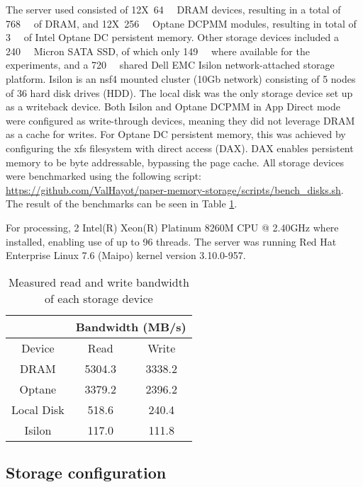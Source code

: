 \documentclass[conference]{IEEEtran}
\begin{document}
The server used consisted of 12X~\SI{64}{\gibi\byte} DRAM devices,
resulting in a total of \SI{768}{\gibi\byte} of DRAM, and 12X~\SI{256}{\giga\byte} Optane DCPMM
modules, resulting in total of \SI{3}{\tebi\byte} of Intel Optane DC persistent memory.
Other storage devices included a \SI{240}{\gibi\byte} Micron SATA SSD, of which
only \SI{149}{\gibi\byte} where available for the experiments, and a
\SI{720}{\tebi\byte} shared Dell EMC Isilon network-attached storage platform. Isilon is an nsf4 mounted
cluster (10Gb network) consisting of 5 nodes of 36 hard disk drives (HDD). The local disk
was the only storage device set up as a writeback device. Both Isilon and Optane DCPMM in
App Direct mode were configured as write-through devices, meaning they did not leverage
DRAM as a cache for writes. For Optane DC persistent memory, this was achieved by configuring the xfs filesystem with
direct access (DAX). DAX enables persistent memory to be byte addressable, bypassing the page cache. All storage devices were benchmarked using the following script: \url{https://github.com/ValHayot/paper-memory-storage/scripts/bench_disks.sh}.
The result of the benchmarks can be seen in Table \ref{table:bandwidths}.

For processing,
2 Intel(R) Xeon(R) Platinum 8260M CPU @ 2.40GHz where installed, enabling use of up to 96 threads.
The server was running Red Hat Enterprise Linux 7.6 (Maipo) kernel version 3.10.0-957. 


\begin{table}
\begin{center}
 \begin{tabular}{ |c|c|c| } 
     \cline{2-3}
     \multicolumn{1}{c|}{} & \multicolumn{2}{c|}{Bandwidth (MB/s)} \\\hline
  Device & Read & Write \\
 \hline
 DRAM & 5304.3 & 3338.2 \\  
 Optane & 3379.2 & 2396.2 \\   
 Local Disk & 518.6 & 240.4 \\
 Isilon & 117.0 & 111.8 \\
 \hline
\end{tabular}\caption{Measured read and write bandwidth of each storage device}\label{table:bandwidths}
\end{center}
\end{table}



\subsection{Storage configuration}
\end{document}
